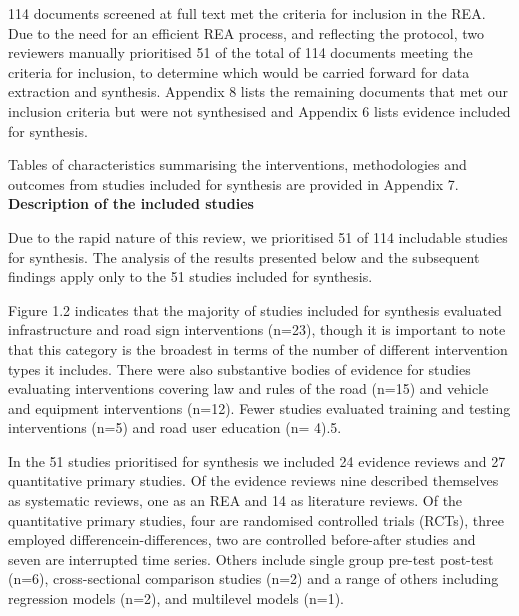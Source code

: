 \documentclass[a4paper,12pt]{article}
\begin{document}
\par 114 documents screened at full text met the criteria for 
inclusion in the REA. Due to the need for an efficient REA process, 
and reflecting the protocol, two reviewers manually prioritised 51 of 
the total of 114 documents meeting the criteria for inclusion, to 
determine which would be carried forward for data extraction and 
synthesis. Appendix 8 lists the remaining documents that met our 
inclusion criteria but were not synthesised and Appendix 6 lists 
evidence included for synthesis. \\

\par Tables of characteristics summarising the interventions, 
methodologies and outcomes from studies included for synthesis are 
provided in Appendix 7. \\

\textbf{Description of the included studies} \\

\par Due to the rapid nature of this review, we prioritised 51 of 114 
includable studies for synthesis. The analysis of the results 
presented below and the subsequent findings apply only to the 51 
studies included for synthesis. \\

\par Figure 1.2 indicates that the majority of studies included for 
synthesis evaluated infrastructure and road sign interventions (n=23), 
though it is important to note that this category is the broadest in 
terms of the number of different intervention types it includes. There 
were also substantive bodies of evidence for studies evaluating 
interventions covering law and rules of the road (n=15) and vehicle 
and equipment interventions (n=12). Fewer studies evaluated training 
and testing interventions (n=5) and road user education (n= 4).5. \\ 

\par In the 51 studies prioritised for synthesis we included 24 
evidence reviews and 27 quantitative primary studies. Of the evidence 
reviews nine described themselves as
systematic reviews, one as an REA and 14 as literature reviews. Of the 
quantitative primary studies, four are randomised controlled trials 
(RCTs), three employed differencein-differences, two are controlled 
before-after studies and seven are interrupted time series. Others 
include single group pre-test post-test (n=6), cross-sectional 
comparison studies (n=2) and a range of others including regression 
models (n=2), and multilevel models (n=1). \\
\end{document}
